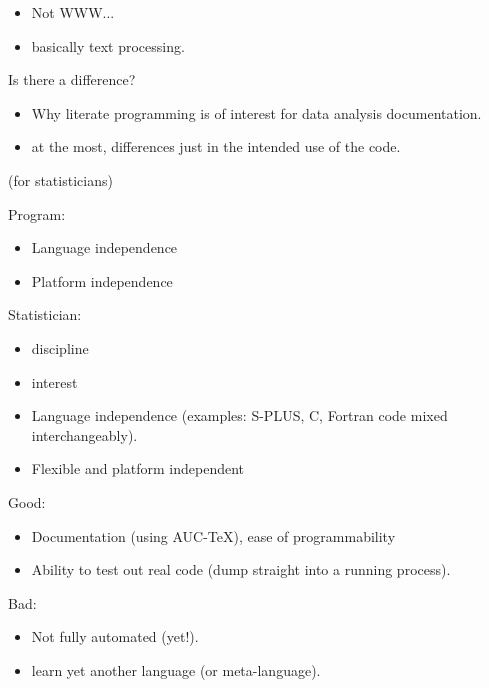\documentclass[semhelv]{seminar}
\begin{document}
\begin{itemize}
\item Not WWW...
\item basically text processing.
\end{itemize}

\begin{slide}
  
  Is there a difference? 
\end{slide}

\begin{itemize}
\item Why literate programming is of interest for data analysis
  documentation. 
\item at the most, differences just in the intended use of the code.

\end{itemize}

\begin{slide}
  (for statisticians)

  Program:
  \begin{itemize}
  \item Language independence 
  \item Platform independence
  \end{itemize}

  Statistician:
  \begin{itemize}
  \item discipline
  \item interest
  \end{itemize}
\end{slide}

\begin{itemize}
\item Language independence (examples: S-PLUS, C, Fortran code mixed
  interchangeably).
\item Flexible and platform independent
\end{itemize}

\begin{slide}
  
  Good:
  \begin{itemize}
  \item Documentation (using AUC-TeX), ease of programmability
  \item Ability to test out real code (dump straight into a running
    process).
  \end{itemize}
  Bad:
  \begin{itemize}
  \item Not fully automated (yet!).
  \item learn yet another language (or meta-language).
  \end{itemize}
  
\end{slide}
\end{document}
